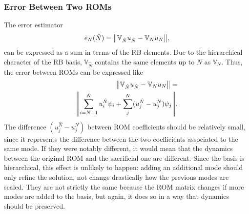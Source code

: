\documentclass[../../thesis.tex]{subfiles}
\newcommand{\rbV}{\ensuremath{\mathbb{V}}}
\begin{document}
\subsubsection{Error Between Two ROMs}
The error estimator 
\begin{equation}
    \tilde{e}_{N}(\hat{N}) = \norm{\rbV_{\hat{N}} u_{\hat{N}} - \rbV_{N} u_{N}},
\end{equation}
can be expressed as a sum in terms of the RB elements.
Due to the hierarchical character of the RB basis, $\rbV_{\hat{N}}$ contains the same elements 
up to $N$ as $\rbV_{N}$.
Thus, the error between ROMs can be expressed like
\begin{equation}
    \begin{split}
        \norm{\rbV_{\hat{N}} u_{\hat{N}} - \rbV_{N} u_{N}} 
        = \\ 
        \norm{
        \sum_{i=N+1}^{\hat{N}} u^{\hat{N}}_{i} \psi_{i} 
        + 
        \sum_{j}^{N} (u^{\hat{N}}_{j} - u^{N}_{j}) \psi_j
        }.
    \end{split}
\end{equation}
The difference $(u^{\hat{N}}_{j} - u^{N}_{j})$ between ROM coefficients should be relatively small, 
since it represents the difference between the two coefficients associated to the same mode.
If they were notably different, 
it would mean that the dynamics between the original ROM and the sacrificial one are different.
Since the basis is hierarchical, this effect is unlikely to happen: 
adding an additional mode should only refine the solution, 
not change drastically how the previous modes are scaled.
They are not strictly the same because the ROM matrix changes if more modes are added to the basis,
but again, it does so in a way that dynamics should be preserved.
\end{document}
